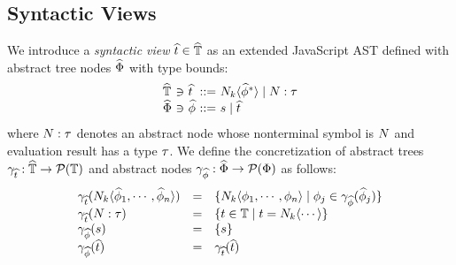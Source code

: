 \subsection{Syntactic Views}\label{sec:view}

We introduce a \textit{syntactic view} $\widehat{t} \in \widehat{\mathbb{T}}$ as an extended
JavaScript AST defined with abstract tree nodes $\widehat{\Phi}$ with type bounds:
\[
  \begin{array}{l@{~}c@{~}l@{~}c@{~}l}
    \atreeset &\ni& \atree &::=& \nt_k \langle \anode^* \rangle \mid \nt: \ty \\
    \anodeset &\ni& \anode &::=& \str \mid \atree\\
  \end{array}
\]
where $N: \tau$ denotes an abstract node whose nonterminal symbol is $N$ and
evaluation result has a type $\tau$.  We define the concretization of abstract
trees $\gamma_{\widehat{t}}: \widehat{\mathbb{T}} \rightarrow \mathcal{P}(\mathbb{T})$ and abstract
nodes $\gamma_{\widehat{\phi}}: \widehat{\Phi} \rightarrow \mathcal{P}(\Phi)$ as follows:
\[
  \begin{array}{lcl}
    \gamma_{\widehat{t}}(N_k \langle \widehat{\phi}_1, \cdots, \widehat{\phi}_n \rangle) &=&
    \{ N_k \langle \phi_1, \cdots, \phi_n \rangle \mid \phi_j \in
    \gamma_{\widehat{\phi}}(\widehat{\phi}_j) \}\\

    \gamma_{\widehat{t}}(N: \tau) &=&
    \{ t \in \mathbb{T} \mid t = N_k \langle \cdots \rangle \}\\

    \gamma_{\widehat{\phi}}(s) &=& \{ s \}\\

    \gamma_{\widehat{\phi}}(\widehat{t}) &=& \gamma_{\widehat{t}}(\widehat{t})\\
  \end{array}
\]

